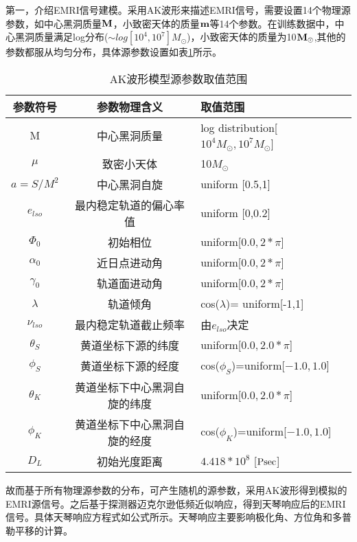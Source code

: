 
第一，介绍EMRI信号建模。采用AK波形来描述EMRI信号，需要设置14个物理源参数，如中心黑洞质量$\bf{M}$，小致密天体的质量$\bf{m}$等14个参数。在训练数据中，中心黑洞质量满足log分布($\sim log[10^4,10^7]M_\odot$)，小致密天体的质量为10$\bf{M_\odot}$,其他的参数都服从均匀分布，具体源参数设置如表\ref{tab:AKW-sources}所示。
\begin{table}[htbp]
    \caption{\label{tab:AKW-sources}AK波形模型源参数取值范围}
    \wuhao
    \begin{tabularx}{\linewidth}{c|c|X<{\centering}}
        \hline
        参数符号 & 参数物理含义 &取值范围 \\ \hline
        M  & 中心黑洞质量 & log distribution[$10^4M_{\odot},10^7 M_{\odot}$]\\ \hline
        $\mu $ & 致密小天体  & 10$M_{\odot}$\\ \hline
        $a=S/M^2$ & 中心黑洞自旋 & uniform [0.5,1] \\ \hline
        $e_{lso}$ & 最内稳定轨道的偏心率值 & uniform [0,0.2]\\ \hline
        $\Phi_0$  & 初始相位 & uniform[$0.0,2*\pi$]\\ \hline
        $\alpha_0$  & 近日点进动角 & uniform[$0.0,2*\pi$]\\ \hline
        $\gamma_0$ & 轨道面进动角 & uniform[$0.0,2*\pi$]\\ \hline
        $\lambda$  & 轨道倾角 & cos($\lambda$)= uniform[-1,1]\\ \hline
        $\nu_{lso}$  & 最内稳定轨道截止频率 & 由$e_{lso}$决定\\ \hline
        $\theta_S$  & 黄道坐标下源的纬度 & uniform[$0.0,2.0*\pi$]\\ \hline
        $\phi_S$  & 黄道坐标下源的经度 & cos($\phi_S$)=uniform[$-1.0,1.0$]\\ \hline
        $\theta_K$  & 黄道坐标下中心黑洞自旋的纬度 & uniform[$0.0,2.0*\pi$]\\ \hline
        $\phi_K$  & 黄道坐标下中心黑洞自旋的经度 & cos($\phi_K$)=uniform[$-1.0,1.0$]\\ \hline
        $D_L$  & 初始光度距离 & $4.418*10^8$ [$\rm Psec$]\\ \hline
    \end{tabularx}
\end{table}

故而基于所有物理源参数的分布，可产生随机的源参数，采用AK波形得到模拟的EMRI源信号。之后基于探测器迈克尔逊低频近似响应，得到天琴响应后的EMRI信号。具体天琴响应方程式如公式所示。天琴响应主要影响极化角、方位角和多普勒平移的计算。

